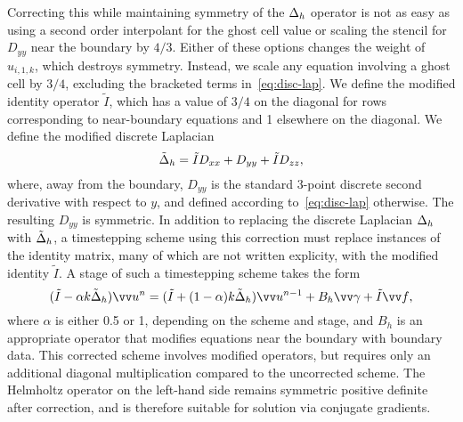 Correcting this while maintaining symmetry of the $\Delta_h$ operator is not as easy as using a second order
interpolant for the ghost cell value or scaling the stencil for $D_{yy}$ near the boundary by $4/3$. Either of
these options changes the weight of $u_{i, 1, k}$, which destroys symmetry. Instead, we scale any equation
involving a ghost cell by $3/4$, excluding the bracketed terms in~\eqref{eq:disc-lap}. We define the modified
identity operator $\tilde{I}$, which has a value of $3/4$ on the diagonal for rows corresponding to near-boundary
equations and 1 elsewhere on the diagonal. We define the modified discrete Laplacian
\begin{equation}\label{eq:mod-disc-lap}
    \tilde{\Delta}_h = \tilde{I}D_{xx} + D_{yy} + \tilde{I}D_{zz},
\end{equation}
where, away from the boundary, $D_{yy}$ is the standard 3-point discrete second derivative with respect to $y$,
and defined according to~\eqref{eq:disc-lap} otherwise.  The resulting $D_{yy}$ is symmetric. In addition to
replacing the discrete Laplacian $\Delta_h$ with $\tilde{\Delta}_h$, a timestepping scheme using this
correction must replace instances of the identity matrix, many of which are not written explicity, with the
modified identity $\tilde{I}$. A stage of such a timestepping scheme takes the form
\begin{equation*}
    (\tilde{I} - \alpha k\tilde{\laplacian}_h)\arr{u}^n = (\tilde{I} + (1-\alpha)k\tilde{\laplacian}_h)\arr{u}^{n-1} + B_h\arr{\gamma} + \tilde{I}\arr{f},
\end{equation*}
where $\alpha$ is either 0.5 or 1, depending on the scheme and stage, and $B_h$ is an appropriate operator that
modifies equations near the boundary with boundary data. This corrected scheme involves modified operators, but
requires only an additional diagonal multiplication compared to the uncorrected scheme. The Helmholtz operator on
the left-hand side remains symmetric positive definite after correction, and is therefore suitable for solution
via conjugate gradients.
